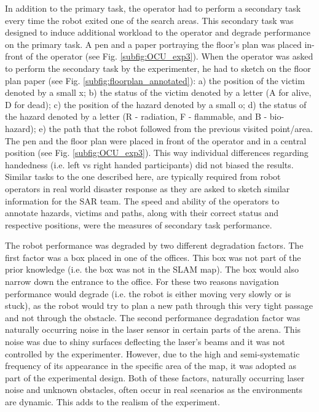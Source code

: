 \documentclass[a4paper,12pt,oneside,openright]{bhamthesis}
\begin{document}
In addition to the primary task, the operator had to perform a secondary task every time the robot exited one of the search areas. This secondary task was designed to induce additional workload to the operator and degrade performance on the primary task. A pen and a paper portraying the floor's plan was placed in-front of the operator (see Fig. \ref{subfig:OCU_exp3}). When the operator was asked to perform the secondary task by the experimenter, he had to sketch on the floor plan paper (see Fig. \ref{subfig:floorplan_annotated}): a) the position of the victim denoted by a small x; b) the status of the victim denoted by a letter (A for alive, D for dead); c) the position of the hazard denoted by a small o; d) the status of the hazard denoted by a letter (R - radiation, F - flammable, and B - bio-hazard); e) the path that the robot followed from the previous visited point/area. The pen and the floor plan were placed in front of the operator and in a central position (see Fig. \ref{subfig:OCU_exp3}). This way individual differences regarding handedness (i.e. left vs right handed participants) did not biased the results. Similar tasks to the one described here, are typically required from robot operators in real world disaster response \citep{Murphy2004} as they are asked to sketch similar information for the SAR team. The speed and ability of the operators to annotate hazards, victims and paths, along with their correct status and respective positions, were the measures of secondary task performance.

The robot performance was degraded by two different degradation factors. The first factor was a box placed in one of the offices. This box was not part of the prior knowledge (i.e. the box was not in the SLAM map). The box would also narrow down the entrance to the office. For these two reasons navigation performance would degrade (i.e. the robot is either moving very slowly or is stuck), as the robot would try to plan a new path through this very tight passage and not through the obstacle. The second performance degradation factor was naturally occurring noise in the laser sensor in certain parts of the arena. This noise was due to shiny surfaces deflecting the laser's beams and it was not controlled by the experimenter. However, due to the high and semi-systematic frequency of its appearance in the specific area of the map, it was adopted as part of the experimental design. Both of these factors, naturally occurring laser noise and unknown obstacles, often occur in real scenarios as the environments are dynamic. This adds to the realism of the experiment.  
\end{document}
